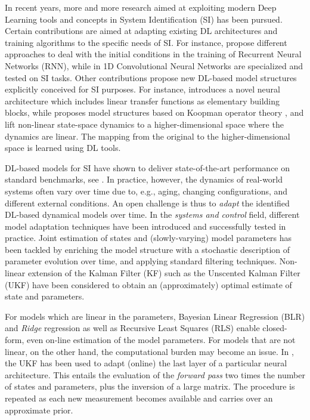\documentclass{article}
\begin{document}
In recent years, more and more research aimed at exploiting modern Deep Learning tools and concepts in System Identification (SI) has been pursued. Certain contributions are aimed at adapting existing DL architectures and training algorithms to the specific needs of SI. For instance, \cite{beintema2021nonlinear, forgione2021continuous} propose different approaches to  deal with the initial conditions in the training of Recurrent Neural Networks (RNN), while in \cite{andersson2019deep} 1D Convolutional Neural Networks are specialized and tested on SI tasks. Other contributions propose new DL-based model structures explicitly conceived for SI purposes. 
For instance, \cite{forgione2021dynonet} introduces a novel neural architecture which includes linear transfer
functions as elementary building blocks, while \cite{iacob2021deep} proposes model structures based on Koopman operator theory \cite{mauroy2020koopman}, and  lift non-linear state-space dynamics to a higher-dimensional space where the dynamics are linear. The mapping from the original to the higher-dimensional space is learned using DL tools.

DL-based models for SI have shown to deliver state-of-the-art performance on standard benchmarks, see \cite{iacob2021deep, mavkov2020integrated}.
In practice, however, the dynamics of real-world systems often vary over time due to, e.g., aging, changing configurations, and different external conditions. 
An open challenge is thus to \emph{adapt} the identified DL-based dynamical models over time.
In the \emph{systems and control} field, different model adaptation techniques have been introduced and successfully tested in practice. 
Joint estimation of states and (slowly-varying) model 
parameters has been tackled by enriching the model structure with a stochastic description of parameter evolution over time, and applying standard filtering techniques. Non-linear extension of the Kalman Filter (KF) such as the Unscented Kalman Filter (UKF)  \cite{pozzoli2020tustin} have been considered to obtain an (approximately) optimal estimate of state and parameters.

For models which are linear in the parameters, Bayesian Linear Regression (BLR) and \emph{Ridge} regression \cite{hastie01statisticallearning} as well as Recursive Least Squares (RLS) \cite{Ljung} enable  closed-form, even on-line estimation of the model parameters. For models that are not linear, on the other hand, the computational burden may become an issue. In \cite{pozzoli2020tustin}, the UKF has been used to adapt (online) the last layer of a particular neural architecture. This  entails the evaluation of the \emph{forward pass} two times the number of states and parameters, plus the inversion of a large matrix. The procedure is repeated as each new measurement becomes available and carries over an approximate prior. 
\end{document}
